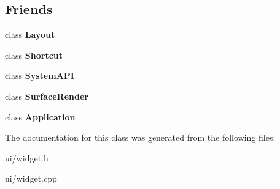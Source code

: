 \subsection*{Friends}
\begin{DoxyCompactItemize}
\item 
\hypertarget{class_tempest_1_1_widget_ac902f1ffeb3ca8ce28827888af71848b}{class {\bfseries Layout}}\label{class_tempest_1_1_widget_ac902f1ffeb3ca8ce28827888af71848b}

\item 
\hypertarget{class_tempest_1_1_widget_a3ca6eb492cffcbd6535b0e6a19d0dafe}{class {\bfseries Shortcut}}\label{class_tempest_1_1_widget_a3ca6eb492cffcbd6535b0e6a19d0dafe}

\item 
\hypertarget{class_tempest_1_1_widget_a81a96e8e06bdd16bd87b9bff53d8f1d7}{class {\bfseries System\+A\+P\+I}}\label{class_tempest_1_1_widget_a81a96e8e06bdd16bd87b9bff53d8f1d7}

\item 
\hypertarget{class_tempest_1_1_widget_a9b082801c8cd4fe4c994d21e1fad565c}{class {\bfseries Surface\+Render}}\label{class_tempest_1_1_widget_a9b082801c8cd4fe4c994d21e1fad565c}

\item 
\hypertarget{class_tempest_1_1_widget_a23f25bcc02a0e94c2f5a4188496b04d0}{class {\bfseries Application}}\label{class_tempest_1_1_widget_a23f25bcc02a0e94c2f5a4188496b04d0}

\end{DoxyCompactItemize}


The documentation for this class was generated from the following files\+:\begin{DoxyCompactItemize}
\item 
ui/widget.\+h\item 
ui/widget.\+cpp\end{DoxyCompactItemize}
